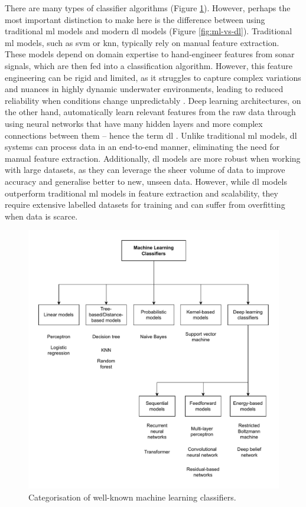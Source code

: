 There are many types of classifier algorithms (Figure \ref{fig:ml-classifiers-mindmap}). However, perhaps the most important distinction to make here is the difference between using traditional \acrlong{ml} models and modern \acrlong{dl} models (Figure \ref{fig:ml-vs-dl}). Traditional \acrshort{ml} models, such as \acrshort{svm} or \acrshort{knn}, typically rely on manual feature extraction. These models depend on domain expertise to hand-engineer features from sonar signals, which are then fed into a classification algorithm. However, this feature engineering can be rigid and limited, as it struggles to capture complex variations and nuances in highly dynamic underwater environments, leading to reduced reliability when conditions change unpredictably \cite[2]{kamal_deep_2013}. Deep learning architectures, on the other hand, automatically learn relevant features from the raw data through using neural networks that have many hidden layers and more complex connections between them -- hence the term \acrlong{dl} \cite{neupane_review_2020}. Unlike traditional \acrshort{ml} models, \acrshort{dl} systems can process data in an end-to-end manner, eliminating the need for manual feature extraction. Additionally, \acrshort{dl} models are more robust when working with large datasets, as they can leverage the sheer volume of data to improve accuracy and generalise better to new, unseen data. However, while \acrshort{dl} models outperform traditional \acrshort{ml} models in feature extraction and scalability, they require extensive labelled datasets for training and can suffer from overfitting when data is scarce.

\begin{figure}[p]
    \centering
    \includegraphics[width=\textwidth]{img/ch2/ml_classifiers.pdf}
    \caption{Categorisation of well-known machine learning classifiers.}
    \label{fig:ml-classifiers-mindmap}
\end{figure}

